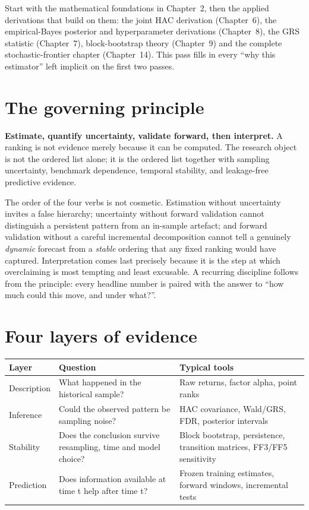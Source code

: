 Start with the mathematical foundations in Chapter~2, then the applied
derivations that build on them: the joint HAC derivation (Chapter~6), the
empirical-Bayes posterior and hyperparameter derivations (Chapter~8), the
GRS statistic (Chapter~7), block-bootstrap theory (Chapter~9) and the
complete stochastic-frontier chapter (Chapter~14). This pass fills in
every ``why this estimator'' left implicit on the first two passes.

\hypertarget{the-governing-principle}{%
\section{The governing principle}\label{the-governing-principle}}

\textbf{Estimate, quantify uncertainty, validate forward, then
interpret.} A ranking is not evidence merely because it can be computed.
The research object is not the ordered list alone; it is the ordered
list together with sampling uncertainty, benchmark dependence, temporal
stability, and leakage-free predictive evidence.

The order of the four verbs is not cosmetic. Estimation without
uncertainty invites a false hierarchy; uncertainty without forward
validation cannot distinguish a persistent pattern from an in-sample
artefact; and forward validation without a careful incremental decomposition
cannot tell a genuinely \emph{dynamic} forecast from a
\emph{stable} ordering that any fixed ranking would have captured.
Interpretation comes last precisely because it is the step at which
overclaiming is most tempting and least excusable. A recurring discipline
follows from the principle: every headline number is paired with the
answer to ``how much could this move, and under what?''.

\hypertarget{four-layers-of-evidence}{%
\section{Four layers of evidence}\label{four-layers-of-evidence}}

\begin{longtable}[]{@{}p{}p{}p{}@{}}
\toprule\noalign{}
Layer & Question & Typical tools \\
\midrule\noalign{}
\endhead
\bottomrule\noalign{}
\endlastfoot
Description & What happened in the historical sample? & Raw returns,
factor alpha, point ranks \\
Inference & Could the observed pattern be sampling noise? & HAC
covariance, Wald/GRS, FDR, posterior intervals \\
Stability & Does the conclusion survive resampling, time and model
choice? & Block bootstrap, persistence, transition matrices, FF3/FF5
sensitivity \\
Prediction & Does information available at time t help after time t? &
Frozen training estimates, forward windows, incremental tests \\
\end{longtable}


